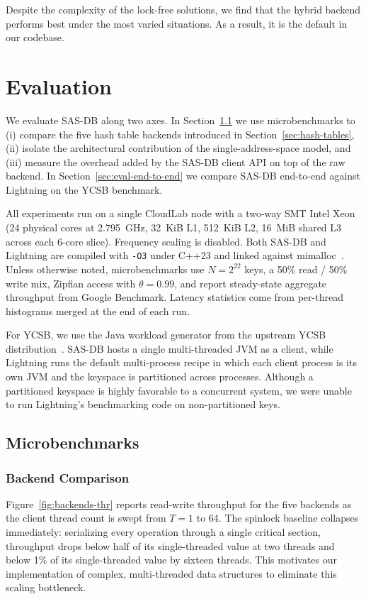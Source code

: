 Despite the complexity of the lock-free solutions, we find that the hybrid
backend performs best under the most varied situations. As a result, it is the
default in our codebase.

\section{Evaluation}
\label{sec:eval}

We evaluate SAS-DB along two axes. In Section~\ref{sec:eval-micro} we use
microbenchmarks to (i) compare the five hash table backends introduced in
Section~\ref{sec:hash-tables}, (ii) isolate the architectural contribution of
the single-address-space model, and (iii) measure the overhead added by the
SAS-DB client API on top of the raw backend. In
Section~\ref{sec:eval-end-to-end} we compare SAS-DB end-to-end against
Lightning on the YCSB benchmark.

All experiments run on a single CloudLab node with a two-way SMT Intel Xeon (24
physical cores at 2.795~GHz, 32~KiB L1, 512~KiB L2, 16~MiB shared L3 across each
6-core slice). Frequency scaling is disabled. Both SAS-DB and Lightning are
compiled with \texttt{-O3} under C++23 and linked against
mimalloc~\cite{leijen19mimalloc}. Unless otherwise noted, microbenchmarks use $N
= 2^{22}$ keys, a 50\% read / 50\% write mix, Zipfian access with $\theta =
0.99$, and report steady-state aggregate throughput from Google Benchmark.
Latency statistics come from per-thread histograms merged at the end of each
run.

For YCSB, we use the Java workload generator from the upstream YCSB
distribution~\cite{cooper10ycsb}. SAS-DB hosts a single multi-threaded JVM as a
client, while Lightning runs the default multi-process recipe in which each
client process is its own JVM and the keyspace is partitioned across processes.
Although a partitioned keyspace is highly favorable to a concurrent system, we
were unable to run Lightning's benchmarking code on non-partitioned keys.

\subsection{Microbenchmarks}
\label{sec:eval-micro}

\subsubsection{Backend Comparison}
Figure~\ref{fig:backends-thr} reports read-write throughput for the five
backends as the client thread count is swept from $T = 1$ to 64. The spinlock
baseline collapses immediately: serializing every operation through a single
critical section, throughput drops below half of its single-threaded value at
two threads and below 1\% of its single-threaded value by sixteen threads. This
motivates our implementation of complex, multi-threaded data structures to
eliminate this scaling bottleneck.

